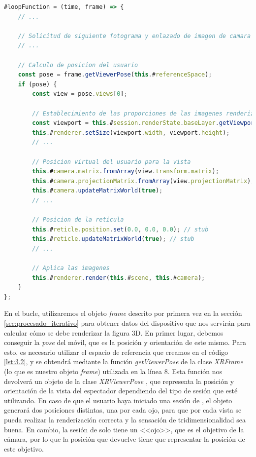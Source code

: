 \documentclass{subfiles}
\begin{document}
        \begin{lstlisting}[language=JavaScript, caption={Uso de la librería Three.js durante el bucle de renderizado.}, label={lst:3.3}]
#loopFunction = (time, frame) => {
    // ...
    
    // Solicitud de siguiente fotograma y enlazado de imagen de camara con modelo
    // ...
    
    // Calculo de posicion del usuario
    const pose = frame.getViewerPose(this.#referenceSpace);
    if (pose) {
        const view = pose.views[0];
        
        // Establecimiento de las proporciones de las imagenes renderizadas
        const viewport = this.#session.renderState.baseLayer.getViewport(view);
        this.#renderer.setSize(viewport.width, viewport.height);
        // ...
        
        // Posicion virtual del usuario para la vista
        this.#camera.matrix.fromArray(view.transform.matrix);
        this.#camera.projectionMatrix.fromArray(view.projectionMatrix);
        this.#camera.updateMatrixWorld(true);
        // ...

        // Posicion de la reticula
        this.#reticle.position.set(0.0, 0.0, 0.0); // stub
        this.#reticle.updateMatrixWorld(true); // stub
        // ...
        
        // Aplica las imagenes
        this.#renderer.render(this.#scene, this.#camera);
    }
};
\end{lstlisting}

        En el bucle, utilizaremos el objeto \textit{frame} descrito por primera vez en la sección \ref{sec:procesado_iterativo} para obtener datos del dispositivo que nos servirán para calcular cómo se debe renderizar la figura 3D. En primer lugar, debemos conseguir la \textit{pose} del móvil, que es la posición y orientación de este mismo. Para esto, es necesario utilizar el espacio de referencia que creamos en el código \ref{lst:3.2}, y se obtendrá mediante la función \textit{getViewerPose} de la clase \textit{XRFrame} (lo que es nuestro objeto \textit{frame}) utilizada en la línea 8. Esta función nos devolverá un objeto de la clase \textit{XRViewerPose} \cite{web:mozilla_xrviewerpose}, que representa la posición y orientación de la vista del espectador dependiendo del tipo de sesión que esté utilizando. En caso de que el usuario haya iniciado una sesión de \rv, el objeto generará dos posiciones distintas, una por cada ojo, para que por cada vista se pueda realizar la renderización correcta y la sensación de tridimensionalidad sea buena. En cambio, la sesión de \ra solo tiene un <<ojo>>, que es el objetivo de la cámara, por lo que la posición que devuelve tiene que representar la posición de este objetivo.
\end{document}
